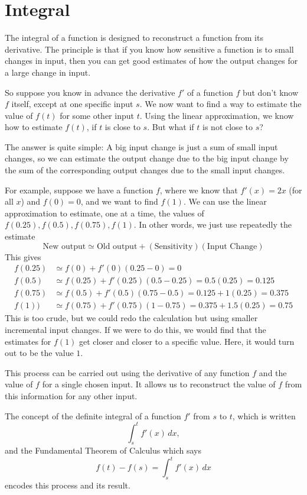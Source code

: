 \documentclass{math-deane}
\begin{document}
\section{Integral}

The integral of a function is designed to reconstruct a function from its derivative. The principle is that if you know how sensitive a function is to small changes in input, then you can get good estimates of how the output changes for a large change in input.

So suppose you know in advance the derivative $f'$ of a function $f$ but don't know $f$ itself, except at one specific input $s$. We now want to find a way to estimate the value of $f(t)$ for some other input $t$. Using the linear approximation, we know how to estimate $f(t)$, if $t$ is close to $s$. But what if $t$ is not close to $s$?

The answer is quite simple: A big input change is just a sum of small input changes, so we can estimate the output change due to  the big input change by the sum of the corresponding output changes due to the small input changes.

For example, suppose we have a function $f$, where we know that $f'(x) = 2x$ (for all $x$) and $f(0) = 0$, and we want to find $f(1)$. We can use the linear approximation to estimate, one at a time, the values of $f(0.25), f(0.5), f(0.75), f(1)$. In other words, we just use repeatedly the estimate
\[
\text{New output} \simeq \text{Old output} + (\text{Sensitivity})(\text{Input Change})
\]
This gives
\begin{align*}
f(0.25)	&\simeq f(0) + f'(0)(0.25-0) = 0\\
f(0.5) &\simeq f(0.25) + f'(0.25)(0.5-0.25) = 0.5(0.25) = 0.125\\
f(0.75) &\simeq f(0.5) + f'(0.5)(0.75-0.5) = 0.125 + 1(0.25) = 0.375\\
f(1)) &\simeq f(0.75) + f'(0.75)(1-0.75) = 0.375 + 1.5(0.25) = 0.75
\end{align*}
This is too crude, but we could redo the calculation but using smaller incremental input changes. If we were to do this, we would find that the estimates for $f(1)$ get closer and closer to a specific value. Here, it would turn out to be the value $1$.

This process can be carried out using the derivative of any function $f$ and the value of $f$ for a single chosen input. It allows us to reconstruct the value of $f$ from this information for any other input.

The concept of the definite integral of a function $f'$ from $s$ to $t$, which is written
\[ \int_s^t f'(x)\,dx, \]
and the Fundamental Theorem of Calculus which says
\[ f(t) - f(s) = \int_s^t f'(x)\,dx \]
encodes this process and its result.
\end{document}
